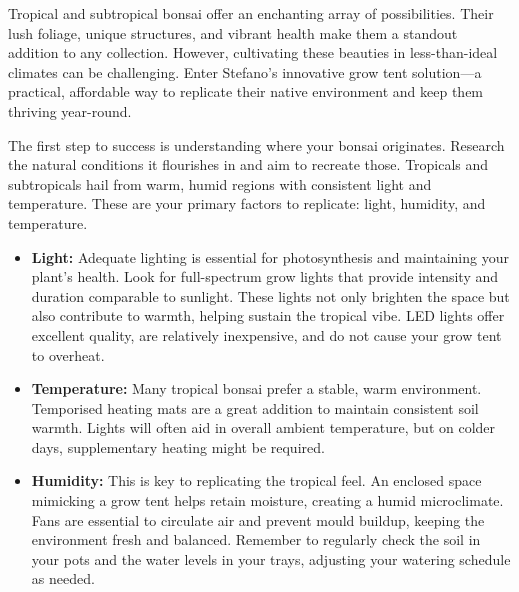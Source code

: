 
\label{growtent}

Tropical and subtropical bonsai offer an enchanting array of possibilities. 
Their lush foliage, unique structures, and vibrant health make them a standout addition to any collection. 
However, cultivating these beauties in less\--than\--ideal climates can be challenging. 
Enter Stefano's innovative grow tent solution\-—a practical, affordable way to replicate their native environment and keep them thriving year\--round.  

\medskip
{}
\noindent
The first step to success is understanding where your bonsai originates. 
Research the natural conditions it flourishes in and aim to recreate those. 
Tropicals and sub\-tropicals hail from warm, humid regions with consistent light and temperature. 
These are your primary factors to replicate: light, humidity, and temperature.  

\medskip
{}
\noindent
\begin{itemize}
	\item \textbf{Light:} Adequate lighting is essential for photosynthesis and maintaining your plant's health. 
	Look for full\--spectrum grow lights that provide intensity and duration comparable to sunlight. 
	These lights not only brighten the space but also contribute to warmth, helping sustain the tropical vibe.
	LED lights offer excellent quality, are relatively inexpensive, and do not cause your grow tent to overheat.
   
	\item \textbf{Temperature:} Many tropical bonsai prefer a stable, warm environment. 
	Temporised heating mats are a great addition to maintain consistent soil warmth. 
	Lights will often aid in overall ambient temperature, but on colder days, supplementary heating might be required.  
	
	\item \textbf{Humidity:} This is key to replicating the tropical feel. An enclosed space mimicking a grow tent helps retain moisture, creating a humid microclimate. 
	Fans are essential to circulate air and prevent mould buildup, keeping the environment fresh and balanced. 
	Remember to regularly check the soil in your pots and the water levels in your trays, adjusting your watering schedule as needed.
\end{itemize}

